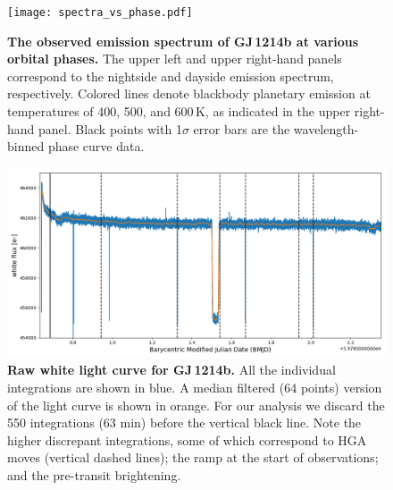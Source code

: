 \documentclass[pdflatex,sn-standardnature]{sn-jnl}%
\begin{document}
\begin{figure}[h]
    \centering
\texttt{[image: spectra\_vs\_phase.pdf]}
\caption{\textbf{The observed emission spectrum of GJ\,1214b at various orbital phases.}  The upper left and upper right-hand panels correspond to the nightside and dayside emission spectrum, respectively.  Colored lines denote blackbody planetary emission at temperatures of 400, 500, and 600\,K, as indicated in the upper right-hand panel. Black points with 1$\sigma$ error bars are the wavelength-binned phase curve data.}
    \label{fig:spectra_vs_phase} 
\end{figure}

\begin{figure}[h]
    \centering
\includegraphics[width=\linewidth]{raw_white_lc}
\caption{\textbf{Raw white light curve for GJ\,1214b.} All the individual integrations are shown in blue. A median filtered (64 points) version of the light curve is shown in orange. For our analysis we discard the 550 integrations (63 min) before the vertical black line.  Note the higher discrepant integrations, some of which correspond to HGA moves (vertical dashed lines); the ramp at the start of observations; and the pre-transit brightening.}
    \label{fig:raw_white_lc} 
\end{figure}
\end{document}
